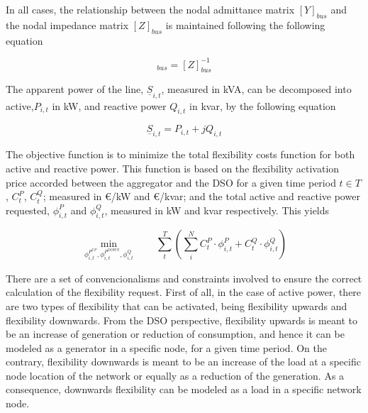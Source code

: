 In all cases, the relationship between the nodal admittance matrix  $[Y]_{bus}$ and the nodal impedance matrix  $[Z]_{bus}$ is maintained following the following equation 

\begin{equation*}
[Y]_{bus} = [Z]_{bus}^{-1}
\end{equation*}

The apparent power of the line, $\underline{S}_{i,t}$, measured in kVA, can be decomposed into active,$P_{i,t}$ in kW, and reactive power $Q_{i,t}$ in kvar, by the following equation 

\begin{equation*}
\underline{S}_{i,t} = P_{i,t} + jQ_{i,t}
\end{equation*}

The objective function is to minimize the total flexibility costs function for both active and reactive power. This function is based on the flexibility activation price accorded between the aggregator and the DSO for a given time period $t \in T$, $C_t^{P}$, $C_t^{Q}$; measured in \euro/kW and \euro/kvar;  and the total active and reactive power requested, $\phi_{i,t}^{P}$ and $\phi_{i,t}^{Q}$, measured in kW and kvar respectively. This yields

\begin{equation*}
\!\min_{\phi_{i,t}^{P^{UP}},\phi_{i,t}^{P^{DOWN}},\phi_{i,t}^{Q}}  \qquad \sum_{t}^{T} \left( \sum_{i}^{N} C_t^{P} \cdot \phi_{i,t}^{P} + C_t^{Q} \cdot \phi_{i,t}^{Q} \right)  
\end{equation*}

There are a set of convencionalisms and constraints involved to ensure the correct calculation of the flexibility request. First of all, in the case of active power, there are two types of flexibility that can be activated, being flexibility upwards and flexibility downwards. From the DSO perspective, flexibility upwards is meant to be an increase of generation or reduction of consumption, and hence it can be modeled as a generator in a specific node, for a given time period. On the contrary, flexibility downwards is meant to be an increase of the load at a specific node location of the network or equally as a reduction of the generation. As a consequence, downwards flexibility can be modeled as a load in a specific network node.

